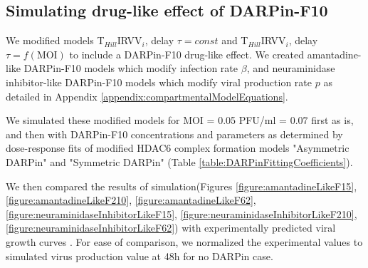 \subsection{Simulating drug-like effect of DARPin-F10}

We modified models T$_{Hill}$IRVV$_i$, delay $\tau = const$ and T$_{Hill}$IRVV$_i$, delay $\tau = f(\text{MOI})$ to include a DARPin-F10 drug-like effect. We created amantadine-like DARPin-F10 models which modify infection rate $\beta$, and neuraminidase inhibitor-like DARPin-F10 models which modify viral production rate $p$ as detailed in Appendix \ref{appendix:compartmentalModelEquations}.

We simulated these modified models for MOI = 0.05 PFU/ml = 0.07 first as is, and then with DARPin-F10 concentrations and parameters as determined by dose-response fits of modified HDAC6 complex formation models "Asymmetric DARPin" and "Symmetric DARPin" (Table \ref{table:DARPinFittingCoefficients}).

We then compared the results of simulation(Figures \ref{figure:amantadineLikeF15}, \ref{figure:amantadineLikeF210}, \ref{figure:amantadineLikeF62}, \ref{figure:neuraminidaseInhibitorLikeF15}, \ref{figure:neuraminidaseInhibitorLikeF210}, \ref{figure:neuraminidaseInhibitorLikeF62}) with experimentally predicted viral growth curves \cite{DarpinData}. For ease of comparison, we normalized the experimental values to simulated virus production value at 48h for no DARPin case.

